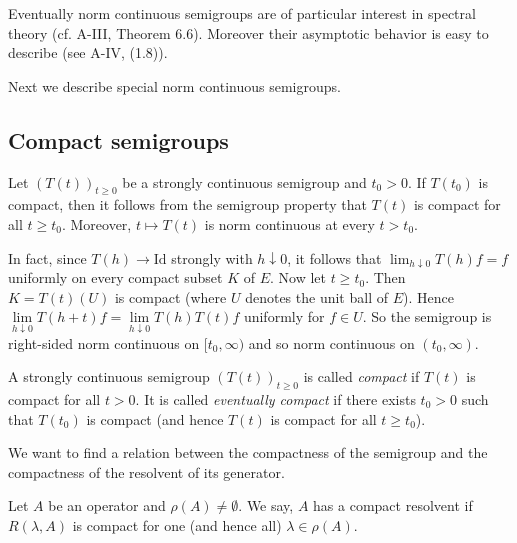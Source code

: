Eventually norm continuous semigroups are of particular interest in spectral theory (cf. A-III, Theorem 6.6).
Moreover their asymptotic behavior is easy to describe (see A-IV, (1.8)).

Next we describe special norm continuous semigroups.
\subsection{Compact semigroups} \label{subsec:a2-1.se7}
Let $(T(t))_{t\geq 0}$ be a strongly continuous semigroup and $t_0 > 0$.
If $T(t_0)$ is compact, then it follows from the semigroup property that $T(t)$ is compact for all $t \geq t_0$.
Moreover, $t \mapsto T(t)$ is norm continuous at every $t > t_0$.

In fact, since $T(h) \to \text{Id}$ strongly with $h \downarrow 0$, it follows that $\lim_{h \downarrow 0} T(h)f = f$ uniformly on every compact subset $K$ of $E$.
Now let $t \geq t_0$.
Then $K = T(t)(U)$ is compact (where $U$ denotes the unit ball of $E$).
Hence $\lim \limits_{h \downarrow 0} T(h+t)f = \lim \limits_{h \downarrow 0} T(h)T(t)f$ uniformly for $f \in U$.
So the semigroup is right-sided norm continuous on $[t_0,\infty)$ and so norm continuous on $(t_0,\infty)$.

\begin{definition}\label{def:a2-1.22}
A strongly continuous semigroup $(T(t))_{t\geq 0}$ is called \emph{compact} if $T(t)$ is compact for all $t > 0$. It is called \emph{eventually compact} if there exists $t_0 > 0$ such that $T(t_0)$ is compact (and hence $T(t)$ is compact for all $t \geq t_0$).
\end{definition}

We want to find a relation between the compactness of the semigroup and the compactness of the resolvent of its generator.

\begin{definition}\label{def:a2-1.23}

Let $A$ be an operator and $\rho(A) \neq \emptyset$.
We say, $A$ has a compact resolvent if $R(\lambda,A)$ is compact for one (and hence all) $\lambda \in \rho(A)$.
\end{definition}

